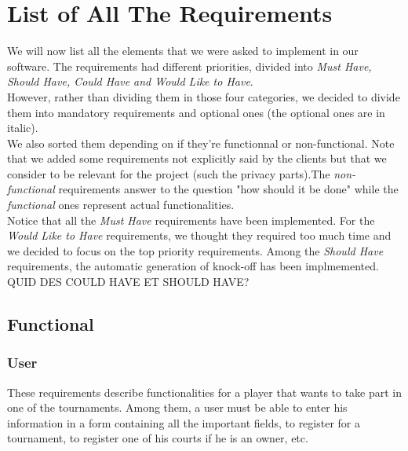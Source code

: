 \documentclass[a4paper, 12pt]{article}
\begin{document}
\newpage
\section{List of All The Requirements}
We will now list all the elements that we were asked to implement in our software. The requirements had different priorities, divided into \textit{Must Have, Should Have, Could Have and Would Like to Have}. \\

However, rather than dividing them in those four categories, we decided to divide them into mandatory requirements and optional ones (the optional ones are in italic). \\

We also sorted  them depending on if they're functionnal or non-functional. Note that we added some requirements not explicitly said by the clients but that we consider to be relevant for the project (such the privacy parts).The \textit{non-functional} requirements answer to the question "how should it be done" while the \textit{functional} ones represent actual functionalities.\\

Notice that all the \textit{Must Have} requirements have been implemented. For the \textit{Would Like to Have} requirements, we thought they required too much time and we decided to focus on the top priority requirements. Among the \textit{Should Have} requirements, the automatic generation of knock-off has been implmemented. QUID DES COULD HAVE ET SHOULD HAVE?\\
\subsection*{Functional}

\subsubsection*{User}
	
	These requirements describe functionalities for a player that wants to take part in one of the tournaments. Among them, a user must be able to enter his information in a form containing all the important fields, to register for a tournament, to register one of his courts if he is an owner, etc.\\
	
\end{document}
